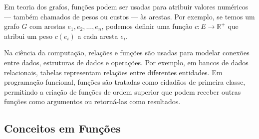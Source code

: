 Em teoria dos grafos, funções podem ser usadas para atribuir valores numéricos --- também chamados de pesos ou custos --- às arestas. Por exemplo, se temos um grafo \(G\) com arestas \(e_1, e_2, \ldots, e_n\), podemos definir uma função \(c: E \to \mathbb{R}^+\) que atribui um peso \(c(e_i)\) a cada aresta \(e_i\).


Na ciência da computação, relações e funções são usadas para modelar conexões entre dados, estruturas de dados e operações. Por exemplo, em bancos de dados relacionais, tabelas representam relações entre diferentes entidades. Em programação funcional, funções são tratadas como cidadãos de primeira classe, permitindo a criação de funções de ordem superior que podem receber outras funções como argumentos ou retorná-las como resultados.

\subsection{Conceitos em Funções}

